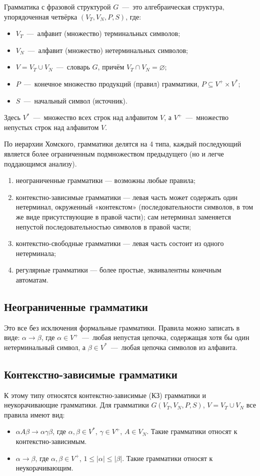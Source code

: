 Грамматика с фразовой структурой $G$~---~это алгебраическая структура, упорядоченная четвёрка $(V_T, V_N, P, S)$, где:
\begin{itemize}
	\item $V_T$~---~алфавит (множество) терминальных символов;
	\item $V_N$~---~алфавит (множество) нетерминальных символов;
	\item $V = V_T \cup V_N$~---~словарь $G$, причём $V_T \cap V_N = \varnothing$;
	\item $P$~---~конечное множество продукций (правил) грамматики, $P \subseteq V^+ \times V^*$;
	\item $S$~---~начальный символ (источник).
\end{itemize}

Здесь $V^{*}$~---~множество всех строк над алфавитом $V$, а $V^{+}$~---~множество непустых строк над алфавитом $V$.

По иерархии Хомского, грамматики делятся на 4 типа, каждый последующий является более ограниченным подмножеством предыдущего (но и легче поддающимся анализу).
\begin{enumerate}
	\item неограниченные грамматики — возможны любые правила;
	\item контекстно-зависимые грамматики — левая часть может содержать один нетерминал, окруженный «контекстом» (последовательности символов, в том же виде присутствующие в правой части); сам нетерминал заменяется непустой последовательностью символов в правой части;
	\item контекстно-свободные грамматики — левая часть состоит из одного нетерминала;
	\item регулярные грамматики — более простые, эквивалентны конечным автоматам.
\end{enumerate}

\subsection{Неограниченные грамматики}
Это все без исключения формальные грамматики. Правила можно записать в виде: $\alpha \rightarrow \beta$, 
где $\alpha \in V^{+}$~---~любая непустая цепочка, содержащая хотя бы один нетерминальный символ, 
а $\beta \in V^{*}$~---~любая цепочка символов из алфавита.

\subsection{Контекстно-зависимые грамматики}
К этому типу относятся контекстно-зависимые (КЗ) грамматики и неукорачивающие грамматики. Для грамматики 
$G(V_{T},V_{N},P,S)$, $V=V_{T}\cup V_{N}$ все правила имеют вид:
\begin{itemize}
	\item $\alpha A\beta \rightarrow \alpha \gamma \beta$, где $\alpha ,\beta \in V^{*}$, $\gamma \in V^{+}$, $A\in V_{N}$. Такие грамматики относят к контекстно-зависимым.
	\item $\alpha \rightarrow \beta$, где $\alpha ,\beta \in V^{+}$, $1\leq |\alpha |\leq |\beta |$. Такие грамматики относят к неукорачивающим.
\end{itemize}

